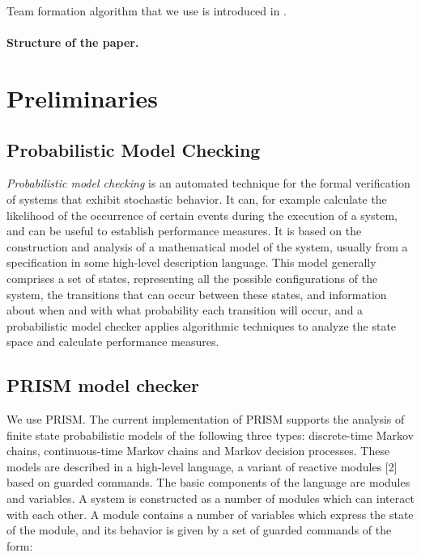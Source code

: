 \documentclass{llncs}
\begin{document}
Team formation algorithm that we use is introduced in \cite{gaston2005agent}.

\paragraph{Structure of the paper.}


\section{Preliminaries}



\subsection{Probabilistic Model Checking}
\emph{Probabilistic model checking} is an automated technique for
the formal verification of systems that exhibit stochastic behavior. It can, for example
calculate the likelihood of the occurrence of certain events
during the execution of a system, and can be useful to establish performance
measures. It is based on the construction and analysis of a
mathematical model of the system, usually from a specification
in some high-level description language. This model
generally comprises a set of states, representing all the possible
configurations of the system, the transitions that can
occur between these states, and information about when and
with what probability each transition will occur, and a probabilistic model checker applies algorithmic techniques to analyze the state space and calculate performance measures.

\subsection{PRISM model checker}

We use PRISM. The current implementation of PRISM supports the analysis of finite state
probabilistic models of the following three types: discrete-time Markov chains,
continuous-time Markov chains and Markov decision processes. These models are
described in a high-level language, a variant of reactive modules [2] based on guarded
commands. The basic components of the language are modules and variables. A
system is constructed as a number of modules which can interact with each other.
A module contains a number of variables which express the state of the module,
and its behavior is given by a set of guarded commands of the form:
\end{document}
